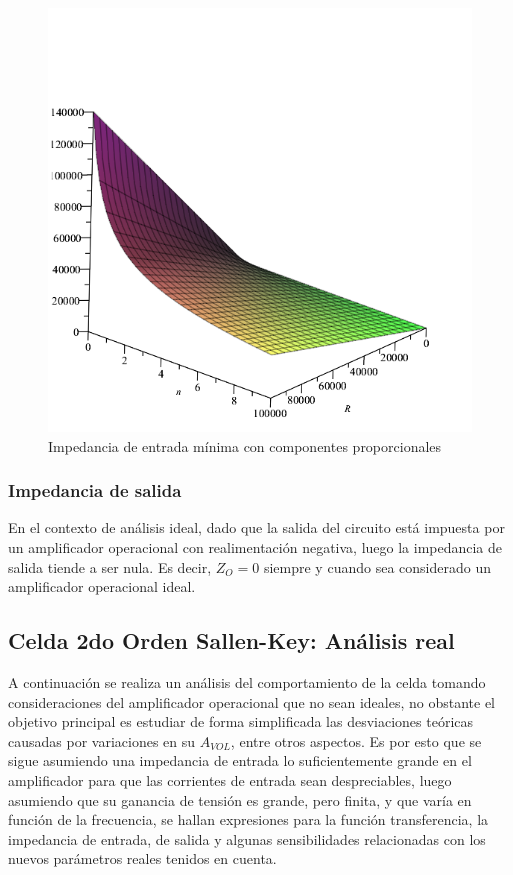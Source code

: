 \begin{figure}[H]
	\centering
	\includegraphics[scale=0.7]{../EJ1/Recursos/impedancia_entrada_componentes_proporcionales.png}
	\caption{Impedancia de entrada m\'inima con componentes proporcionales}
\end{figure}

\subsubsection{Impedancia de salida}
En el contexto de an\'alisis ideal, dado que la salida del circuito est\'a impuesta por un amplificador operacional con realimentaci\'on negativa,
luego la impedancia de salida tiende a ser nula. Es decir, $Z_O = 0$ siempre y cuando sea considerado un amplificador operacional ideal.

\subsection{Celda 2do Orden Sallen-Key: An\'alisis real}
A continuaci\'on se realiza un an\'alisis del comportamiento de la celda tomando consideraciones del amplificador operacional que no sean ideales,
no obstante el objetivo principal es estudiar de forma simplificada las desviaciones te\'oricas causadas por variaciones en su $A_{VOL}$, entre otros aspectos.
Es por esto que se sigue asumiendo una impedancia de entrada lo suficientemente grande en el amplificador para que las corrientes de entrada sean despreciables,
luego asumiendo que su ganancia de tensi\'on es grande, pero finita, y que var\'ia en funci\'on de la frecuencia, se hallan expresiones para la funci\'on transferencia,
la impedancia de entrada, de salida y algunas sensibilidades relacionadas con los nuevos par\'ametros reales tenidos en cuenta. 

